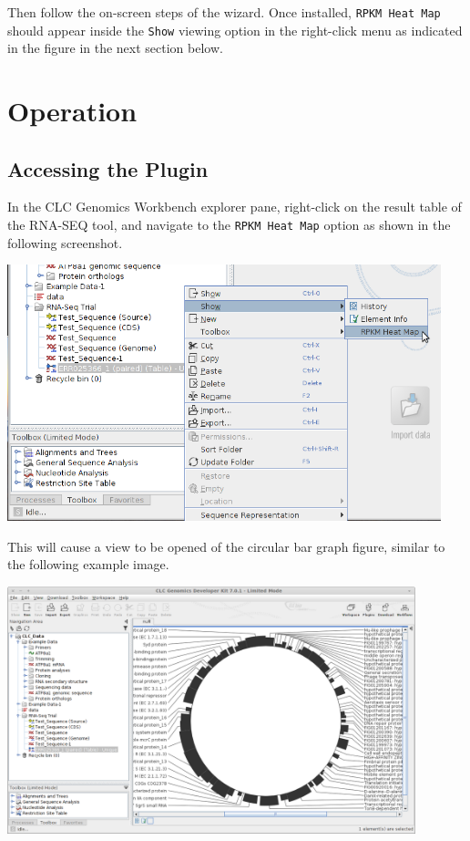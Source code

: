 \documentclass[12pt,letterpaper]{article}
\begin{document}
Then follow the on-screen steps of the wizard.  Once installed, \texttt{RPKM
Heat Map} should appear inside the \texttt{Show} viewing option in the
right-click menu as indicated in the figure in the next section below.

\section{Operation}

\subsection{Accessing the Plugin}

In the CLC Genomics Workbench explorer pane, right-click on the result table of
the RNA-SEQ tool, and navigate to the \texttt{RPKM Heat Map} option as shown in
the following screenshot.

\begin{center}
    \includegraphics[width=34em]{access-plugin.png}
\end{center}

This will cause a view to be opened of the circular bar graph figure, similar
to the following example image.

\begin{center}
    \includegraphics[width=32em]{plugin-result.png}
\end{center}
\end{document}
